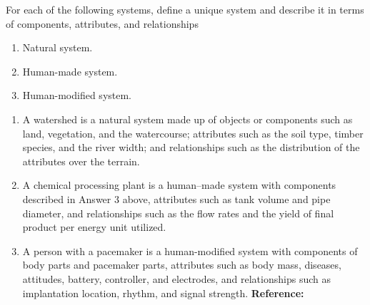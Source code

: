 \begin{exercises}
    \begin{exercise} 
    \label{sea-01-09}
        For each of the following systems, define a unique system and describe it in terms of components, attributes, and relationships
        \begin{enumerate}[label=\alph*)]
            \item Natural system.
            \item Human-made system.
            \item Human-modified system.
        \end{enumerate}
    \end{exercise}
    \begin{solution}
        \begin{enumerate}[label=\alph*)]
            \item A watershed is a natural system made up of objects or components such as land, vegetation, and the watercourse; attributes such as the soil type, timber species, and the river width; and relationships such as the distribution of the attributes over the terrain. 
            \item A chemical processing plant is a human–made system with components described in Answer 3 above, attributes such as tank volume and pipe diameter, and relationships such as the flow rates and the yield of final product per energy unit utilized.
            \item A person with a pacemaker is a human-modified system with components of body parts and pacemaker parts, attributes such as body mass, diseases, attitudes, battery, controller, and electrodes, and relationships such as implantation location, rhythm, and signal strength. \textbf{Reference:}
        \end{enumerate}
    \end{solution}
    

\end{exercises}
